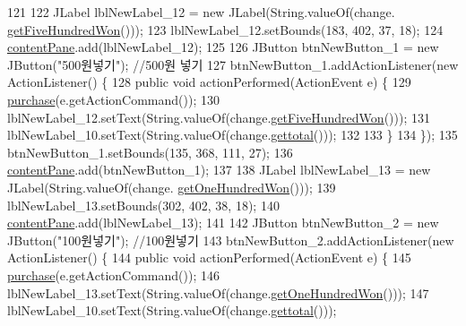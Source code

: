 \begin{DoxyCode}
121         
122         JLabel lblNewLabel\_12 = \textcolor{keyword}{new} JLabel(String.valueOf(change.
      \hyperlink{class_vending_machine_1_1_change_afa26632165b427a19133f182996587a3}{getFiveHundredWon}()));
123         lblNewLabel\_12.setBounds(183, 402, 37, 18);
124         \hyperlink{class_vending_machine_1_1_machine_u_i_ac8ef25585e46da798d067af0eefa1a03}{contentPane}.add(lblNewLabel\_12);
125         
126         JButton btnNewButton\_1 = \textcolor{keyword}{new} JButton(\textcolor{stringliteral}{"500원넣기"}); \textcolor{comment}{//500원 넣기}
127         btnNewButton\_1.addActionListener(\textcolor{keyword}{new} ActionListener() \{
128             \textcolor{keyword}{public} \textcolor{keywordtype}{void} actionPerformed(ActionEvent e) \{
129                 \hyperlink{class_vending_machine_1_1_machine_u_i_aadccf593dc69281c9ebbfe1fbe09b804}{purchase}(e.getActionCommand());
130                 lblNewLabel\_12.setText(String.valueOf(change.\hyperlink{class_vending_machine_1_1_change_afa26632165b427a19133f182996587a3}{getFiveHundredWon}()));
131                 lblNewLabel\_10.setText(String.valueOf(change.\hyperlink{class_vending_machine_1_1_change_a07a32d7240178343fa1273d075d73c64}{gettotal}()));
132 
133             \}
134         \});
135         btnNewButton\_1.setBounds(135, 368, 111, 27);
136         \hyperlink{class_vending_machine_1_1_machine_u_i_ac8ef25585e46da798d067af0eefa1a03}{contentPane}.add(btnNewButton\_1);
137         
138         JLabel lblNewLabel\_13 = \textcolor{keyword}{new} JLabel(String.valueOf(change.
      \hyperlink{class_vending_machine_1_1_change_ac814aaff5cfe37b1a71899f750f4d99e}{getOneHundredWon}()));
139         lblNewLabel\_13.setBounds(302, 402, 38, 18);
140         \hyperlink{class_vending_machine_1_1_machine_u_i_ac8ef25585e46da798d067af0eefa1a03}{contentPane}.add(lblNewLabel\_13);
141         
142         JButton btnNewButton\_2 = \textcolor{keyword}{new} JButton(\textcolor{stringliteral}{"100원넣기"}); \textcolor{comment}{//100원넣기}
143         btnNewButton\_2.addActionListener(\textcolor{keyword}{new} ActionListener() \{
144             \textcolor{keyword}{public} \textcolor{keywordtype}{void} actionPerformed(ActionEvent e) \{
145                 \hyperlink{class_vending_machine_1_1_machine_u_i_aadccf593dc69281c9ebbfe1fbe09b804}{purchase}(e.getActionCommand());
146                 lblNewLabel\_13.setText(String.valueOf(change.\hyperlink{class_vending_machine_1_1_change_ac814aaff5cfe37b1a71899f750f4d99e}{getOneHundredWon}()));
147                 lblNewLabel\_10.setText(String.valueOf(change.\hyperlink{class_vending_machine_1_1_change_a07a32d7240178343fa1273d075d73c64}{gettotal}()));

\end{DoxyCode}
